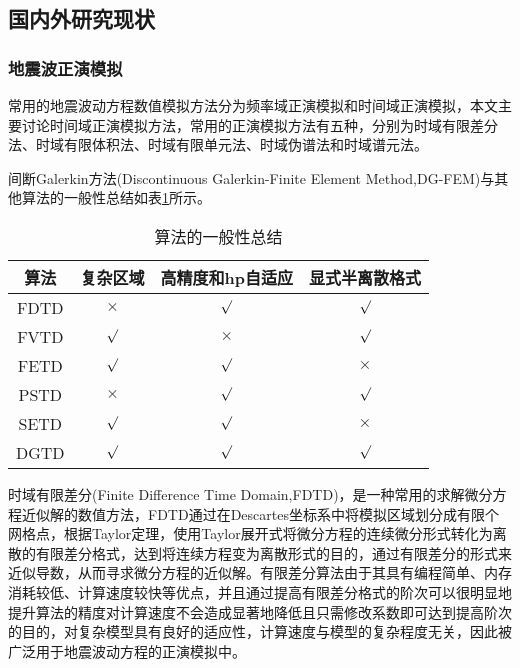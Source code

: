 \documentclass[12pt]{article}
\newcommand{\upcite}[1]{\textsuperscript{\textsuperscript{\cite{#1}}}}
\begin{document}
\subsection{国内外研究现状}
\subsubsection{地震波正演模拟}
常用的地震波动方程数值模拟方法分为频率域正演模拟和时间域正演模拟，本文主要讨论时间域正演模拟方法，常用的正演模拟方法有五种，分别为时域有限差分法、时域有限体积法、时域有限单元法、时域伪谱法和时域谱元法\upcite{HeXijun2015}。
\par
间断Galerkin方法(Discontinuous Galerkin-Finite Element Method,DG-FEM)与其他算法的一般性总结如表\ref{AlgoTab}所示。
\begin{table}[H]
\centering
\caption{算法的一般性总结}\label{AlgoTab}
\renewcommand\tabcolsep{1.5em}
\begin{tabular}{cccc}
\toprule
{算法} & {复杂区域}  & {高精度和hp自适应} & {显式半离散格式} \\
\midrule 
FDTD & $\times$ & $\surd$ & $\surd$\\

FVTD & $\surd$ & $\times$ & $\surd$\\

FETD & $\surd$ & $\surd$ & $\times$\\

PSTD & $\times$ & $\surd$ & $\surd$\\

SETD & $\surd$ & $\surd$ & $\times$\\

DGTD & $\surd$ & $\surd$ & $\surd$\\

\bottomrule
\end{tabular}
\end{table}
\par
时域有限差分(Finite Difference Time Domain,FDTD)，是一种常用的求解微分方程近似解的数值方法，FDTD通过在Descartes坐标系中将模拟区域划分成有限个网格点，根据Taylor定理，使用Taylor展开式将微分方程的连续微分形式转化为离散的有限差分格式，达到将连续方程变为离散形式的目的，通过有限差分的形式来近似导数，从而寻求微分方程的近似解。有限差分算法由于其具有编程简单、内存消耗较低、计算速度较快等优点，并且通过提高有限差分格式的阶次可以很明显地提升算法的精度对计算速度不会造成显著地降低且只需修改系数即可达到提高阶次的目的，对复杂模型具有良好的适应性，计算速度与模型的复杂程度无关，因此被广泛用于地震波动方程的正演模拟中。
\par
\end{document}
